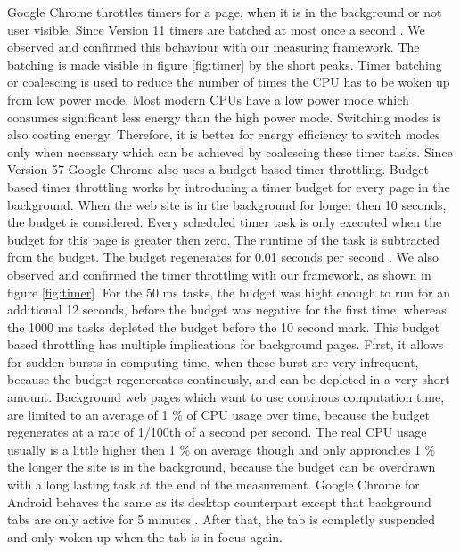 \documentclass[
	ruledheaders=section,%
	class=report,%
	thesis={type=bachelor},%
	accentcolor=9c,%
	custommargins=true,%
	marginpar=false,%
	parskip=half-,%
	fontsize=11pt,%
]{tudapub}
\begin{document}
  Google Chrome throttles timers for a page, when it is in the background or not user visible. Since Version 11 timers are batched at most once a second \cite{chrome-background-tabs}. We observed and confirmed this behaviour with our measuring framework. The batching is made visible in figure \ref{fig:timer} by the short peaks. Timer batching or coalescing is used to reduce the number of times the CPU has to be woken up from low power mode. Most modern CPUs have a low power mode which consumes significant less energy than the high power mode. Switching modes is also costing energy. Therefore, it is better for energy efficiency to switch modes only when necessary which can be achieved by coalescing these timer tasks. Since Version 57 Google Chrome also uses a budget based timer throttling. Budget based timer throttling works by introducing a timer budget for every page in the background. When the web site is in the background for longer then 10 seconds, the budget is considered. Every scheduled timer task is only executed when the budget for this page is greater then zero. The runtime of the task is subtracted from the budget. The budget regenerates for 0.01 seconds per second \cite{chrome-background-tabs}. We also observed and confirmed the timer throttling with our framework, as shown in figure \ref{fig:timer}. For the 50 ms tasks, the budget was hight enough to run for an additional 12 seconds, before the budget was negative for the first time, whereas the 1000 ms tasks depleted the budget before the 10 second mark. This budget based throttling has multiple implications for background pages. First, it allows for sudden bursts in computing time, when these burst are very infrequent, because the budget regenereates continously, and can be depleted in a very short amount. Background web pages which want to use continous computation time, are limited to an average of 1 \% of CPU usage over time, because the budget regenerates at a rate of 1/100th of a second per second. The real CPU usage usually is a little higher then 1 \% on average though and only approaches 1 \% the longer the site is in the background, because the budget can be overdrawn with a long lasting task at the end of the measurement. Google Chrome for Android behaves the same as its desktop counterpart except that background tabs are only active for 5 minutes \cite{chrome-android-suspend}. After that, the tab is completly suspended and only woken up when the tab is in focus again.
\end{document}
